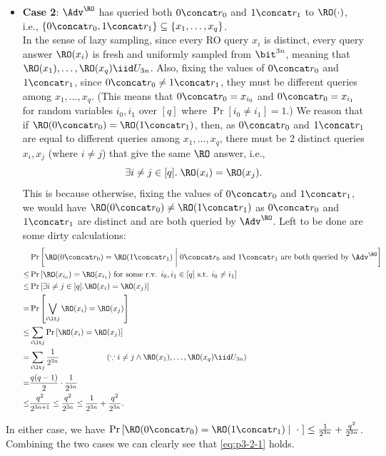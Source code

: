 \begin{answer}[ii]
\begin{itemize}
        \item \textbf{Case 2}: $\Adv^\RO$ has queried both $0\concat r_0$ and $1\concat r_1$ to $\RO(\cdot)$, i.e., $\{0\concat r_0, 1\concat r_1\}\subseteq \{x_1,\ldots, x_q\}$.\\
        In the sense of lazy sampling, since every RO query $x_i$ is distinct, every query answer $\RO(x_i)$ is fresh and uniformly sampled from $\bit^{3n}$, meaning that $\RO(x_1),\ldots, \RO(x_q)\iid U_{3n}$.
        Also, fixing the values of $0\concat r_0$ and $1\concat r_1$, since $0\concat r_0 \neq 1\concat r_1$, they must be different queries among $x_1,\ldots, x_q$.
        (This means that $0\concat r_0= x_{i_0}$ and $0\concat r_0= x_{i_1}$ for random variables $i_0, i_1$ over $[q]$ where $\Pr[i_0\neq i_1]=1$.)
        We reason that if $\RO(0\concat r_0)=\RO(1\concat r_1)$, then, as $0\concat r_0$ and $1\concat r_1$ are equal to different queries among $x_1,\ldots, x_q$, there must be 2 distinct queries $x_i,x_j$ (where $i\neq j$) that give the same $\RO$ answer, i.e.,
        \[
            \exists i\neq j\in [q].\; \RO(x_i) = \RO(x_j).
        \]
        This is because otherwise, fixing the values of $0\concat r_0$ and $1\concat r_1$, we would have $\RO(0\concat r_0) \neq \RO(1\concat r_1)$ as $0\concat r_0$ and $1\concat r_1$ are distinct and are both queried by $\Adv^\RO$.
        Left to be done are some dirty calculations:
        \begin{align*}
            &\Pr\left[\RO(0\concat r_0)=\RO(1\concat r_1) \biggm\vert 0\concat r_0 \textrm{ and } 1\concat r_1 \textrm{ are both queried by } \Adv^\RO \right]\\
            \le& \Pr\left[\RO(x_{i_0})=\RO(x_{i_1})  \textrm{ for some r.v. } i_0, i_1 \in [q] \textrm{ s.t. } i_0\neq i_1  \right]\\
            \le&  \Pr\left[\exists i\neq j\in [q]. \RO(x_i)=\RO(x_j) \right]\\
            =& \Pr\left[\bigvee_{i\lt j} \RO(x_i)=\RO(x_j)\right]\\
            \le& \sum_{i\lt j} \Pr\left[\RO(x_i)=\RO(x_j)\right]\\
            =& \sum_{i\lt j} \frac{1}{2^{3n}} \qquad\qquad\qquad (\because i\neq j \land \RO(x_1),\ldots, \RO(x_q)\iid U_{3n} )\\
            =& \frac{q(q-1)}{2} \cdot \frac{1}{2^{3n}}\\
            \le&  \frac{q^2}{2^{3n+1}}  \le  \frac{q^2}{2^{3n}}  \le \frac{1}{2^{3n}}+ \frac{q^2}{2^{3n}}.
        \end{align*}
    \end{itemize}
    In either case, we have $\Pr\left[\RO(0\concat r_0)=\RO(1\concat r_1)\mid \;\cdot\;\right]\le \frac{1}{2^{3n}}+ \frac{q^2}{2^{3n}}$. Combining the two cases we can clearly see that \eqref{eq:p3-2-1} holds.


\end{answer}

